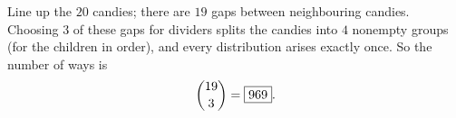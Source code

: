 Line up the $20$ candies; there are $19$ gaps between neighbouring candies. Choosing $3$ of these gaps for dividers splits the candies into $4$ nonempty groups (for the children in order), and every distribution arises exactly once. So the number of ways is
\[\dbinom{19}{3}=\boxed{969}.\]
